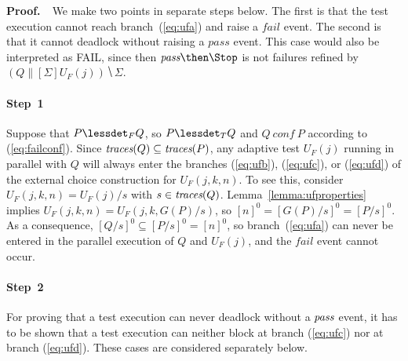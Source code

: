 \documentclass[3p,times]{elsarticle}
\newcommand{\trc}{\text{\it traces}}
\newcommand{\epass}{{\text{\it pass}}}
\newenvironment{proof}[1][]
{

\medskip
\noindent
{\bf Proof.\ }}
{
}
\begin{document}
\begin{proof}{~}We make two points in separate steps below. The
first is that the test execution cannot reach branch~(\ref{eq:ufa}) and raise
a $fail$ event.  The second is that it cannot deadlock without raising a
$pass$ event. This case would also be interpreted as FAIL, since then
$\epass\then\Stop$ is not failures refined by $(Q\parallel[\Sigma]
U_F(j))\hide \Sigma$.

\paragraph{Step~1} Suppose that $P\lessdet_F Q$, so $P\lessdet_T Q$ and $Q\
conf\ P$ according to (\ref{eq:failconf}). Since   $\trc(Q)\subseteq
\trc(P)$, any adaptive test $U_F(j)$ running in parallel with $Q$ will always
enter the branches (\ref{eq:ufb}), (\ref{eq:ufc}), or (\ref{eq:ufd}) of the
external choice construction for $U_F(j,k,n)$. To see this, consider
 $U_F(j,k,n) = U_F(j)/s$
with $s\in\trc(Q)$. Lemma~\ref{lemma:ufproperties} implies $U_F(j,k,n) =
U_F(j,k,G(P)/s)$, so $[n]^0 = [G(P)/s]^0 = [P/s]^0$. As a consequence,
$[Q/s]^0\subseteq [P/s]^0 = [n]^0$, so branch~(\ref{eq:ufa}) can never be
entered in the parallel execution of $Q$ and $U_F(j)$, and the $fail$ event
cannot occur.

\paragraph{Step~2} For proving that a test execution can never deadlock without a
$\epass$ event, it has to be shown that a test execution can neither block at
branch (\ref{eq:ufc}) nor at branch (\ref{eq:ufd}). These cases are
considered separately below.


\end{proof}
\end{document}
